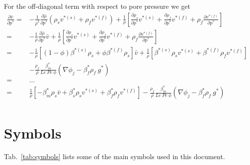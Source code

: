 \documentclass[]{scrreprt}
\begin{document}
For the off-diagonal term with respect to pore pressure we get
\begin{subequations}
  \begin{align}
  \frac{\partial \bar{v}}{\partial p^*} =& -\frac{1}{\bar{\rho}^2}\frac{\partial \bar{\rho}}{\partial p^*} (\rho_s v^{*(s)} + \rho_f v^{*(f)}) + \frac{1}{\bar{\rho}} \left[ \frac{\partial \rho_s}{\partial p^*}v^{*(s)} +\frac{\partial \rho_f}{\partial p^*}v^{*(f)} +\rho_f\frac{\partial v^{*(f)}}{\partial p^*}  \right]\\ \nonumber
  =& -\frac{1}{\bar{\rho}}\frac{\partial \bar{\rho}}{\partial p^*}\bar{v} + \frac{1}{\bar{\rho}} \left[ \frac{\partial \rho_s}{\partial p^*}v^{*(s)} +\frac{\partial \rho_f}{\partial p^*}v^{*(f)} +\rho_f\frac{\partial v^{*(f)}}{\partial p^*}  \right]\\ \nonumber
  =& -\frac{1}{\bar{\rho}}\left[(1-\phi)\beta^{*(s)}\rho_s + \phi\beta^{*(f)}\rho_s \right]\bar{v} + \frac{1}{\bar{\rho}} \left[ \beta^{*(s)}\rho_s v^{*(s)} + \beta^{*(f)}\rho_f v^{*(f)} \right] \\ \nonumber
  &- \frac{\rho_f}{\bar{\rho}}\frac{\beta^*_m}{Le\:Pe\:\phi} \left(\nabla \phi_j - \beta^*_f\rho_f\:g^* \right)  \\ \nonumber
  =& ... \\ \nonumber
  =& \frac{1}{\bar{\rho}}\left[ -\beta^*_m \rho_s \bar{v} + \beta^*_s \rho_s v^{*(s)} + \beta^*_f \rho_f v^{*(f)}    \right] - \frac{\rho_f}{\bar{\rho}}\frac{\beta^*_m}{Le\:Pe\:\phi} \left(\nabla \phi_j - \beta^*_f\rho_f\:g^* \right)  \\ \nonumber  
  \end{align}
\end{subequations}

\chapter{Symbols}
Tab.~\ref{tab:symbols} lists some of the main symbols used in this document.
\end{document}
